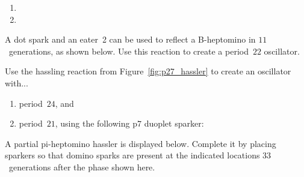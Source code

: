 \begin{multicols}{2}
\begin{problemstar}
\begin{multicols}{2}
\begin{enumerate}
				\item[\bf\color{ocre}(c)] 
				
				\item[\bf\color{ocre}(b)] 
			\end{enumerate}
		\end{multicols}
	\end{problemstar}
	
	
	\mfilbreak
	
	
	\begin{problem}\label{exer:b_heptomino_hassle} 
		A dot spark and an eater~2 can be used to reflect a B-heptomino in $11$~generations, as shown below. Use this reaction to create a period~$22$ oscillator.
		\begin{center}
		\end{center}
	\end{problem}
	
	
	\mfilbreak
	
	
	\begin{problem}\label{exer:pond_block_hasslers} 
		Use the hassling reaction from Figure~\ref{fig:p27_hassler} to create an oscillator with...\smallskip
		
		\begin{enumerate}[label=\bf\color{ocre}(\alph*)]
			\item period~$24$, and%
			
			\item period~$21$, using the following p$7$ duoplet sparker:
			
			\begin{center}
			\end{center}
		\end{enumerate}
	\end{problem}
	
	
	\mfilbreak
	
	
	\begin{problemstar}\label{exer:p44_pi_hassler} 
		A partial pi-heptomino hassler is displayed below. Complete it by placing sparkers so that domino sparks are present at the indicated locations $33$~generations after the phase shown here.
		

\end{problemstar}
\end{multicols}
